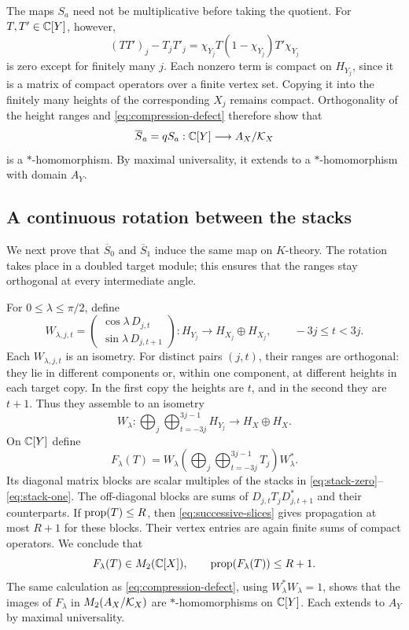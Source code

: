The maps $S_a$ need not be multiplicative before taking the quotient.
For $T,T'\in\mathbb C[Y]$, however,
\begin{equation}\label{eq:compression-defect}
 (TT')_j-T_jT'_j
   =\chi_{Y_j}T(1-\chi_{Y_j})T'\chi_{Y_j}
\end{equation}
is zero except for finitely many $j$.  Each nonzero term is compact on
$H_{Y_j}$, since it is a matrix of compact operators over a finite
vertex set.  Copying it into the finitely many heights of the
corresponding $X_j$ remains compact.  Orthogonality of the height
ranges and \eqref{eq:compression-defect} therefore show that
\[
 \overline S_a=qS_a:\mathbb C[Y]\longrightarrow A_X/\mathcal K_X
\]
is a $*$-homomorphism.  By maximal universality, it extends to a
$*$-homomorphism with domain $A_Y$.

\subsection{A continuous rotation between the stacks}

We next prove that $\overline S_0$ and $\overline S_1$ induce the same
map on $K$-theory.  The rotation takes place in a doubled target module;
this ensures that the ranges stay orthogonal at every intermediate
angle.

For $0\le\lambda\le\pi/2$, define
\[
 W_{\lambda,j,t}=
 \begin{pmatrix}
  \cos\lambda\,D_{j,t}\\
  \sin\lambda\,D_{j,t+1}
 \end{pmatrix}
 :H_{Y_j}\longrightarrow H_{X_j}\oplus H_{X_j},
 \qquad -3j\le t<3j.
\]
Each $W_{\lambda,j,t}$ is an isometry.  For distinct pairs $(j,t)$,
their ranges are orthogonal: they lie in different components or, within
one component, at different heights in each target copy.  In the first
copy the heights are $t$, and in the second they are $t+1$.
Thus they assemble to an
isometry
\[
 W_\lambda:\bigoplus_{j}\bigoplus_{t=-3j}^{3j-1}H_{Y_j}
          \longrightarrow H_X\oplus H_X.
\]
On $\mathbb C[Y]$ define
\begin{equation}\label{eq:stack-rotation}
 F_\lambda(T)=W_\lambda
       \left(\bigoplus_j\bigoplus_{t=-3j}^{3j-1}T_j\right)
       W_\lambda^*.
\end{equation}
Its diagonal matrix blocks are scalar multiples of the stacks in
\eqref{eq:stack-zero}--\eqref{eq:stack-one}.  The off-diagonal blocks
are sums of $D_{j,t}T_jD_{j,t+1}^*$ and their counterparts.  If
$\operatorname{prop}(T)\le R$, then \eqref{eq:successive-slices} gives propagation
at most $R+1$ for these blocks.  Their vertex entries are again finite
sums of compact operators.  We conclude that
\[
 F_\lambda(T)\in M_2(\mathbb C[X]),\qquad
 \operatorname{prop}(F_\lambda(T))\le R+1.
\]
The same calculation as \eqref{eq:compression-defect}, using
$W_\lambda^*W_\lambda=1$, shows that the images of $F_\lambda$ in
$M_2(A_X/\mathcal K_X)$ are $*$-homomorphisms on $\mathbb C[Y]$.  Each extends to
$A_Y$ by maximal universality.

